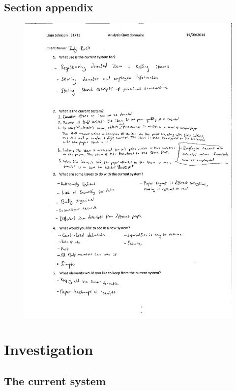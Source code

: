 \subsection{Section appendix}
\begin{figure}[H]
    \includegraphics[width=\textwidth]{./AnalysisPDFs/SectionAppendix.pdf}
    \label{fig:SectionAppendix}
\end{figure}

\section{Investigation}

\subsection{The current system}

